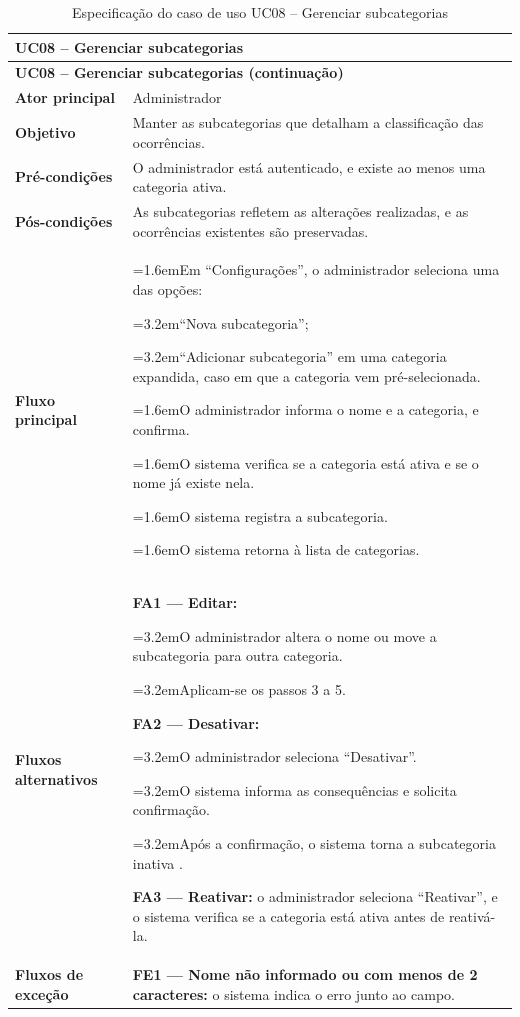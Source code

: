 \documentclass[12pt,a4paper]{article}
\newcommand{\ucitem}[2]{\par\noindent\hangindent=1.6em\hangafter=1\makebox[1.6em][l]{#1}#2}
\newcommand{\ucsubitem}[2]{\par\noindent\hangindent=3.2em\hangafter=1\hspace*{1.6em}\makebox[1.6em][l]{#1}#2}
\begin{document}
\begin{longtable}{|p{}|p{}|}
\caption{Especificação do caso de uso UC08 -- Gerenciar subcategorias}
\label{tab:uc08} \\
\hline
\multicolumn{2}{|l|}{\textbf{UC08 -- Gerenciar subcategorias}} \\
\hline
\endfirsthead

\hline
\multicolumn{2}{|l|}{\textbf{UC08 -- Gerenciar subcategorias (continuação)}} \\
\hline
\endhead

\hline
\endfoot
\textbf{Ator principal} & Administrador \\ \hline
\textbf{Objetivo} & Manter as subcategorias que detalham a classificação das ocorrências. \\ \hline
\textbf{Pré-condições} & O administrador está autenticado, e existe ao menos uma categoria ativa. \\ \hline
\textbf{Pós-condições} & As subcategorias refletem as alterações realizadas, e as ocorrências existentes são preservadas. \\ \hline
\textbf{Fluxo principal} &
\ucitem{1.}{Em ``Configurações'', o administrador seleciona uma das opções:}
\ucsubitem{\textbullet}{``Nova subcategoria'';}
\ucsubitem{\textbullet}{``Adicionar subcategoria'' em uma categoria expandida, caso em que a categoria vem pré-selecionada.}
\ucitem{2.}{O administrador informa o nome e a categoria, e confirma.}
\ucitem{3.}{O sistema verifica se a categoria está ativa e se o nome já existe nela.}
\ucitem{4.}{O sistema registra a subcategoria.}
\ucitem{5.}{O sistema retorna à lista de categorias.} \\ \hline
\textbf{Fluxos alternativos} &
\noindent \textbf{FA1 — Editar:}
\ucsubitem{1.}{O administrador altera o nome ou move a subcategoria para outra categoria.}
\ucsubitem{2.}{Aplicam-se os passos 3 a 5.}
\par\smallskip\noindent \textbf{FA2 — Desativar:}
\ucsubitem{1.}{O administrador seleciona ``Desativar''.}
\ucsubitem{2.}{O sistema informa as consequências e solicita confirmação.}
\ucsubitem{3.}{Após a confirmação, o sistema torna a subcategoria inativa .}
\par\smallskip\noindent \textbf{FA3 — Reativar:} o administrador seleciona ``Reativar'', e o sistema verifica se a categoria está ativa antes de reativá-la. \\ \hline
\textbf{Fluxos de exceção} &
\noindent \textbf{FE1 — Nome não informado ou com menos de 2 caracteres:} o sistema indica o erro junto ao campo.

\end{longtable}
\end{document}
